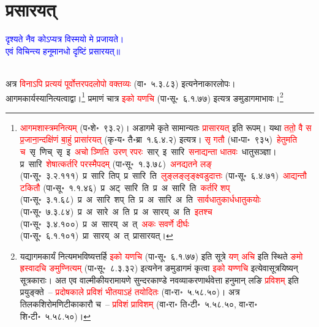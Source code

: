 \section[प्रसारयत्]{प्रसारयत्}
\centering\textcolor{blue}{दृश्यते नैव कोऽप्यत्र विस्मयो मे प्रजायते।\nopagebreak\\
एवं विचिन्त्य हनूमानधो दृष्टिं प्रसारयत्॥}\nopagebreak\\
\\
\fontsize{14}{21}\selectfont\begin{sloppypar}\justifying\noindent\hspace{10mm} अत्र \textcolor{red}{विनाऽपि प्रत्ययं पूर्वोत्तर\-पद\-लोपो वक्तव्यः} (वा॰~५.३.८३) इत्यनेनाकार\-लोपः। आगम\-कार्यस्यानित्यत्वाद्वा।\footnote{\textcolor{red}{आगम\-शास्त्रमनित्यम्} (प॰शे॰~९३.२)। अडागमे कृते सामान्यतः \textcolor{red}{प्रासारयत्} इति रूपम्। यथा \textcolor{red}{ततो॒ वै स प्र॒जाना॒न्दक्षि॑णं बा॒हुं प्रासा॑रयत्} (कृ॰य॰ तै॰ब्रा~१.६.४.२) इत्यत्र। \textcolor{red}{सृ गतौ} (धा॰पा॰~९३५)~\arrow \textcolor{red}{हेतुमति च}~\arrow सृ~णिच्~\arrow सृ~इ~\arrow \textcolor{red}{अचो ञ्णिति}~\arrow \textcolor{red}{उरण् रपरः}~\arrow सार्~इ~\arrow सारि~\arrow \textcolor{red}{सनाद्यन्ता धातवः}~\arrow धातुसञ्ज्ञा। प्र~सारि~\arrow \textcolor{red}{शेषात्कर्तरि परस्मैपदम्} (पा॰सू॰~१.३.७८)~\arrow \textcolor{red}{अनद्यतने लङ्} (पा॰सू॰~३.२.१११)~\arrow प्र~सारि~तिप्~\arrow प्र~सारि~ति~\arrow \textcolor{red}{लुङ्लङ्लृङ्क्ष्वडुदात्तः} (पा॰सू॰~६.४.७१)~\arrow \textcolor{red}{आद्यन्तौ टकितौ} (पा॰सू॰~१.१.४६)~\arrow प्र~अट्~सारि~ति~\arrow प्र~अ~सारि~ति~\arrow \textcolor{red}{कर्तरि शप्‌} (पा॰सू॰~३.१.६८)~\arrow प्र~अ~सारि~शप्~ति~\arrow प्र~अ~सारि~अ~ति~\arrow \textcolor{red}{सार्वधातुकार्ध\-धातुकयोः} (पा॰सू॰~७.३.८४)~\arrow प्र~अ~सारे~अ~ति~\arrow प्र~अ~सारय्~अ~ति~\arrow \textcolor{red}{इतश्च} (पा॰सू॰~३.४.१००)~\arrow प्र~अ~सारय्~अ~त्~\arrow \textcolor{red}{अकः सवर्णे दीर्घः} (पा॰सू॰~६.१.१०१)~\arrow प्रा~सारय्~अ~त्~\arrow प्रासारयत्।} प्रमाणं चात्र \textcolor{red}{इको यणचि} (पा॰सू॰~६.१.७७) इत्यत्र ङमुडागमाभावः।\footnote{यद्यागमकार्यं नित्यमभविष्यत्तर्हि \textcolor{red}{इको यणचि} (पा॰सू॰~६.१.७७) इति सूत्रे \textcolor{red}{यण् अचि} इति स्थिते \textcolor{red}{ङमो ह्रस्वादचि ङमुण्नित्यम्} (पा॰सू॰~८.३.३२) इत्यनेन ङमुडागमं कृत्वा \textcolor{red}{इको यण्णचि} इत्येवासूत्रयिष्यन् सूत्रकाराः। अत एव वाल्मीकीय\-रामायणे सुन्दर\-काण्डे नव\-व्याकरणार्थ\-वेत्ता हनुमान् लङि \textcolor{red}{प्रविशम्} इति प्रयुङ्क्ते~– \textcolor{red}{प्रदोषकाले प्रविशं भीतयाऽहं तयोदितः} (वा॰रा॰~५.५८.५०)। अत्र तिलक\-शिरोमणि\-टीका\-कारौ च~– \textcolor{red}{प्रविशं प्राविशम्} (वा॰रा॰ ति॰टी॰~५.५८.५०, वा॰रा॰ शि॰टी॰~५.५८.५०)।}\end{sloppypar}
